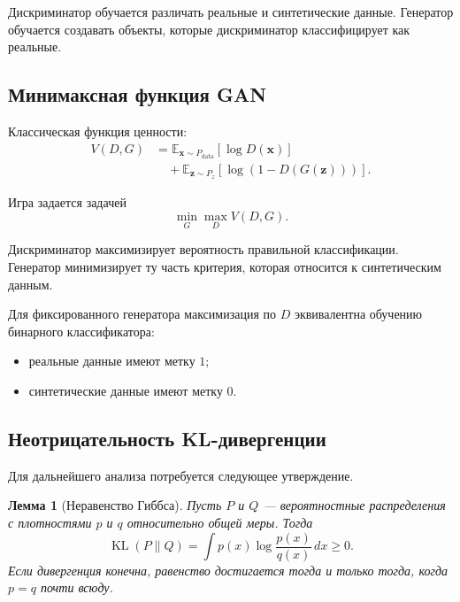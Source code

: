 \documentclass[12pt,a4paper]{article}
\newcommand{\E}{\mathbb{E}}
\newcommand{\KL}{\operatorname{KL}}
\numberwithin{equation}{section}
\newtheorem{lemma}[theorem]{Лемма}
\theoremstyle{definition}
\theoremstyle{remark}
\begin{document}
Дискриминатор обучается различать реальные и синтетические данные.
Генератор обучается создавать объекты, которые дискриминатор
классифицирует как реальные.

\subsection{Минимаксная функция GAN}

Классическая функция ценности:
\[
\begin{split}
    V(D,G)
    &=
    \E_{\bm{x}\sim P_{\mathrm{data}}}
    [\log D(\bm{x})]\\
    &\quad+
    \E_{\bm{z}\sim P_z}
    [\log(1-D(G(\bm{z})))].
\end{split}
\]

Игра задается задачей
\[
    \min_G\max_D V(D,G).
\]

Дискриминатор максимизирует вероятность правильной классификации.
Генератор минимизирует ту часть критерия, которая относится к
синтетическим данным.

Для фиксированного генератора максимизация по \(D\) эквивалентна
обучению бинарного классификатора:

\begin{itemize}
    \item реальные данные имеют метку \(1\);
    \item синтетические данные имеют метку \(0\).
\end{itemize}

\subsection{Неотрицательность KL-дивергенции}

Для дальнейшего анализа потребуется следующее утверждение.

\begin{lemma}[Неравенство Гиббса]
Пусть \(P\) и \(Q\) --- вероятностные распределения с плотностями
\(p\) и \(q\) относительно общей меры. Тогда
\[
    \KL(P\|Q)
    =
    \int p(x)\log\frac{p(x)}{q(x)}\,dx
    \geq 0.
\]
Если дивергенция конечна, равенство достигается тогда и только тогда,
когда \(p=q\) почти всюду.
\end{lemma}
\end{document}
